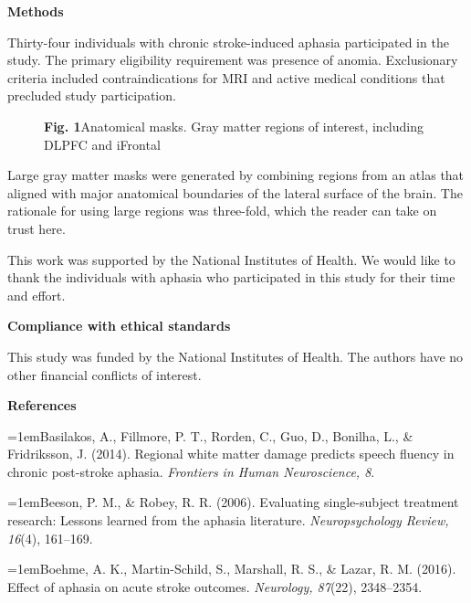 \documentclass[twocolumn,10pt]{article}
\newcommand{\lab}[1]{{\sffamily\bfseries #1}\hspace{0.6em}}
\begin{document}
{\sffamily\bfseries\large Methods}\par\medskip
\noindent Thirty-four individuals with chronic stroke-induced aphasia participated in the study. The primary eligibility requirement was presence of anomia. Exclusionary criteria included contraindications for MRI and active medical conditions that precluded study participation.

\newpage
\begin{figure}[t]
\centering{}\par\smallskip
\raggedright\small\lab{Fig. 1}Anatomical masks. Gray matter regions of interest, including DLPFC and iFrontal
\end{figure}

Large gray matter masks were generated by combining regions from an atlas that aligned with major anatomical boundaries of the lateral surface of the brain. The rationale for using large regions was three-fold, which the reader can take on trust here.

\vfill
{\footnotesize{}\hspace{0.5em}This work was supported by the National Institutes of Health. We would like to thank the individuals with aphasia who participated in this study for their time and effort.\par}
\medskip
{\sffamily\bfseries\large Compliance with ethical standards}\par\smallskip
{\footnotesize{}\hspace{0.5em}This study was funded by the National Institutes of Health. The authors have no other financial conflicts of interest.\par}
\newpage
{\sffamily\bfseries\large References}\par\medskip
{\footnotesize\raggedright
\hangindent=1em\noindent Basilakos, A., Fillmore, P. T., Rorden, C., Guo, D., Bonilha, L., \& Fridriksson, J. (2014). Regional white matter damage predicts speech fluency in chronic post-stroke aphasia. \emph{Frontiers in Human Neuroscience, 8}.\par
\hangindent=1em\noindent Beeson, P. M., \& Robey, R. R. (2006). Evaluating single-subject treatment research: Lessons learned from the aphasia literature. \emph{Neuropsychology Review, 16}(4), 161--169.\par
\hangindent=1em\noindent Boehme, A. K., Martin-Schild, S., Marshall, R. S., \& Lazar, R. M. (2016). Effect of aphasia on acute stroke outcomes. \emph{Neurology, 87}(22), 2348--2354.\par}
\end{document}
